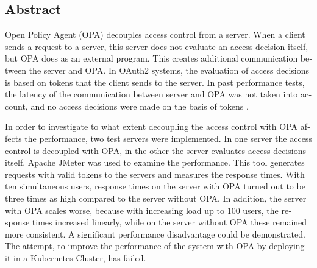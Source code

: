 

\begin{otherlanguage}{american}
	\chapter*{Abstract}

	Open Policy Agent (OPA) decouples access control from a server. When a client sends a request to a server, this server does not evaluate an access decision itself, but OPA does as an external program. This creates additional communication between the server and OPA. In OAuth2 systems, the evaluation of access decisions is based on tokens that the client sends to the server. In past performance tests, the latency of the communication between server and OPA was not taken into account, and no access decisions were made on the basis of tokens \citep{opaperformance:2021:07}.\smallskip

	In order to investigate to what extent decoupling the access control with OPA affects the performance, two test servers were implemented. In one server the access control is decoupled with OPA, in the other the server evaluates access decisions itself. Apache JMeter was used to examine the performance. This tool generates requests with valid tokens to the servers and measures the response times. With ten simultaneous users, response times on the server with OPA turned out to be three times as high compared to the server without OPA. In addition, the server with OPA scales worse, because with increasing load up to 100 users, the response times increased linearly, while on the server without OPA these remained more consistent. A significant performance disadvantage could be demonstrated. The attempt, to improve the performance of the system with OPA by deploying it in a Kubernetes Cluster, has failed.


\end{otherlanguage}
